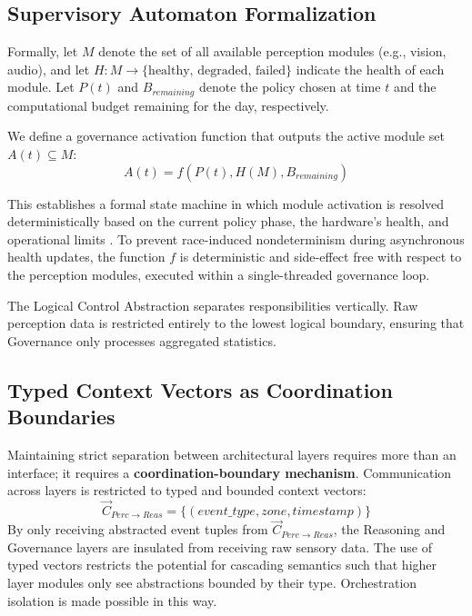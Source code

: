 \documentclass[conference]{IEEEtran}
\begin{document}
\subsection{Supervisory Automaton Formalization}
Formally, let $M$ denote the set of all available perception modules (e.g., vision, audio), and let $H: M \rightarrow \{\text{healthy, degraded, failed}\}$ indicate the health of each module. Let $P(t)$ and $B_{remaining}$ denote the policy chosen at time $t$ and the computational budget remaining for the day, respectively.

We define a governance activation function that outputs the active module set $A(t) \subseteq M$:
\begin{equation}
A(t) = f(P(t), H(M), B_{remaining})
\end{equation}

This establishes a formal state machine in which module activation is resolved deterministically based on the current policy phase, the hardware's health, and operational limits \cite{b26}. To prevent race-induced nondeterminism during asynchronous health updates, the function $f$ is deterministic and side-effect free with respect to the perception modules, executed within a single-threaded governance loop.

The Logical Control Abstraction separates responsibilities vertically. Raw perception data is restricted entirely to the lowest logical boundary, ensuring that Governance only processes aggregated statistics.

\subsection{Typed Context Vectors as Coordination Boundaries}
Maintaining strict separation between architectural layers requires more than an interface; it requires a \textbf{coordination-boundary mechanism}. Communication across layers is restricted to typed and bounded context vectors:
\begin{equation}
\vec{C}_{Perc \to Reas} = \{(event\_type, zone, timestamp)\}
\end{equation}
By only receiving abstracted event tuples from $\vec{C}_{Perc \to Reas}$, the Reasoning and Governance layers are insulated from receiving raw sensory data. The use of typed vectors restricts the potential for cascading semantics such that higher layer modules only see abstractions bounded by their type. Orchestration isolation is made possible in this way.
\end{document}
